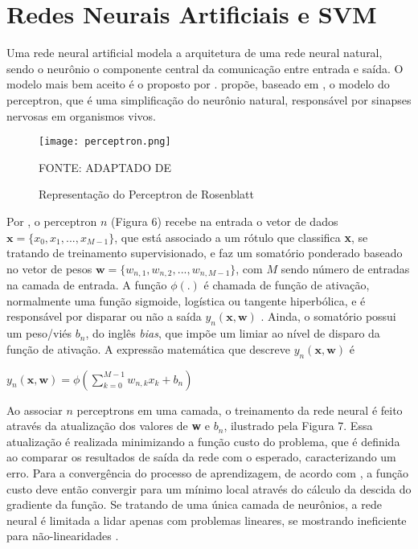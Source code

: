\documentclass[12pt,oneside,a4paper,chapter=TITLE,section=TITLE,sumario=tradicional,english,brazil]{abntex2}
\begin{document}
\section{Redes Neurais Artificiais e SVM}
Uma rede neural artificial modela a arquitetura de uma rede neural natural, sendo o neurônio o componente central da comunicação entre entrada e saída. O modelo mais bem aceito é o proposto por \textcite{McCulloch1943}. \textcite{rosenblatt1958} propõe, baseado em \textcite{McCulloch1943}, o modelo do perceptron, que é uma simplificação do neurônio natural, responsável por sinapses nervosas em organismos vivos.\par
\begin{figure}[ht!]
\centering
\caption{Representação do Perceptron de Rosenblatt}
\par
\texttt{[image: perceptron.png]}
\par
\centering
FONTE: ADAPTADO DE \cite{rosenblatt1958}
\end{figure}
Por \textcite{rosenblatt1958}, o perceptron $n$ (Figura 6) recebe na entrada o vetor de dados $\textbf{x} = \{x_{0},x_{1}, ..., x_{M-1}\}$, que está associado a um rótulo que classifica \textbf{x}, se tratando de treinamento supervisionado, e faz um somatório ponderado baseado no vetor de pesos $\textbf{w} = \{w_{n,1}, w_{n,2}, ..., w_{n,M-1}\}$, com $M$ sendo número de entradas na camada de entrada. A função $\phi(.)$ é chamada de função de ativação, normalmente uma função sigmoide, logística ou tangente hiperbólica, e é responsável por disparar ou não a saída $y_{n}(\textbf{x},\textbf{w})$ \cite{rosenblatt1958}. Ainda, o somatório possui um peso/viés $b_{n}$, do inglês \textit{bias}, que impõe um limiar ao nível de disparo da função de ativação. A expressão matemática que descreve $y_{n}(\textbf{x},\textbf{w})$ \cite{rosenblatt1958} é\par 
\begin{center}
$y_{n}(\textbf{x},\textbf{w}) = \phi(\sum_{k=0}^{M-1} w_{n,k}x_{k} + b_{n})$
\end{center}
\par
Ao associar $n$ perceptrons em uma camada, o treinamento da rede neural é feito através da atualização dos valores de \textbf{w} e $b_{n}$, ilustrado pela Figura 7. Essa atualização é realizada minimizando a função custo do problema, que é definida ao comparar os resultados de saída da rede com o esperado, caracterizando um erro. Para a convergência do processo de aprendizagem, de acordo com \textcite{bishop2006}, a função custo deve então convergir para um mínimo local através do cálculo da descida do gradiente da função. Se tratando de uma única camada de neurônios, a rede neural é limitada a lidar apenas com problemas lineares, se mostrando ineficiente para não-linearidades \cite{haykin2009}.\par 
\end{document}
